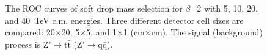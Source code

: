 \begin{figure}
\begin{center}
{ }
\end{center}
\caption{
The ROC curves of soft drop mass selection for $\beta$=2
with 5, 10, 20, and 40~TeV c.m. energies. 
Three different detector cell sizes are compared: 20$\times$20, 
5$\times$5, and 1$\times$1 (cm$\times$cm). 
The signal (background) process is Z'$\rightarrow$t$\bar{\mathrm{t}}$
(Z'$\rightarrow$q$\bar{\mathrm{q}}$).
}
\label{fig:cluster_mass_sdb2_tt_ROC}
\end{figure}





